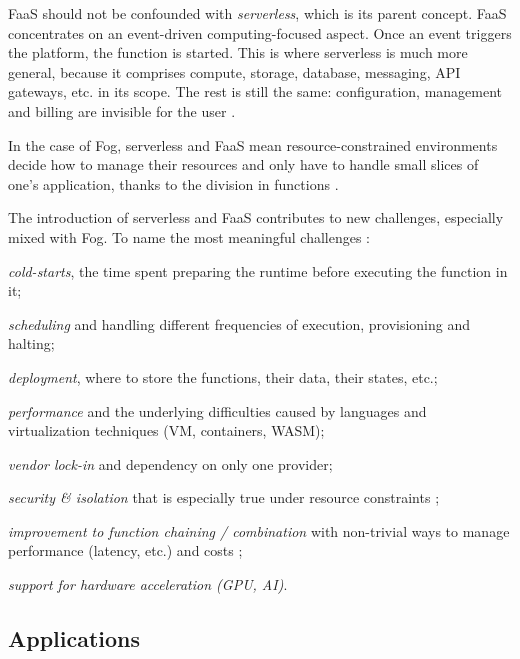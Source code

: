 \documentclass[11pt]{sdm}
\begin{document}
\gls{FaaS} should not be confounded with \emph{serverless}, which is its parent concept. \gls{FaaS} concentrates on an event-driven computing-focused aspect. Once an event triggers the platform, the function is started. This is where serverless is much more general, because it comprises compute, storage, database, messaging, API gateways, etc. in its scope. The rest is still the same: configuration, management and billing are invisible for the user \cite{ibm_faas_2019}.

In the case of Fog, serverless and \gls{FaaS} mean resource-constrained environments decide how to manage their resources and only have to handle small slices of one's application, thanks to the division in functions \cite{bermbach_auctionwhisk_2021}.

The introduction of serverless and \gls{FaaS} contributes to new challenges, especially mixed with Fog. To name the most meaningful challenges \cite{kjorveziroski_iot_2021}:
\begin{enumerate*}
	\item \emph{cold-starts}, the time spent preparing the runtime before executing the function in it;
	\item \emph{scheduling} and handling different frequencies of execution, provisioning and halting;
	\item \emph{deployment}, where to store the functions, their data, their states, etc.;
	\item \emph{performance} and the underlying difficulties caused by languages and virtualization techniques (\gls{VM}, containers, WASM);
	\item \emph{vendor lock-in} and dependency on only one provider;
	\item \emph{security \& isolation} that is especially true under resource constraints \cite{maurice_hello_2017};
	\item \emph{improvement to function chaining / combination} with non-trivial ways to manage performance (latency, etc.) and costs \cite{elgamal_costless_2018};
	\item \emph{support for hardware acceleration (\gls{GPU}, \gls{AI})}.
\end{enumerate*}

\subsection {Applications}
\end{document}

